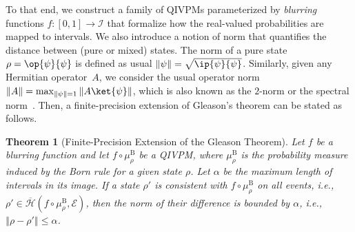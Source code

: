 \documentclass[english,reprint, aps, prl,superscriptaddress, showpacs,
showkeys, longbibliography, amsmath, amssymb, floatfix]{revtex4-1}
\theoremstyle{plain}
\newtheorem{thm}{Theorem}
\theoremstyle{definition}
\newcommand{\Hilb}{\mathcal{H}}
\newcommand{\events}{\ensuremath{\mathcal{E}}}
\newcommand{\proj}[1]{\op{#1}{#1}}
\newcommand{\coreBorn}{\ensuremath{\overline{\Hilb}}}
\newcommand{\ultramodular}{\mathcal{M}}
\begin{document}
To that end, we construct a family of QIVPMs parameterized by
\emph{blurring} functions $f:\left[0,1\right]\rightarrow\mathscr{I}$ that
formalize how the real-valued probabilities are mapped to
intervals. We also introduce a notion of norm that quantifies the
distance between (pure or mixed) states.  The norm of a pure
state $\rho=\proj{\psi}$ is defined as usual
$\left\Vert \psi\right\Vert =\sqrt{\ip{\psi}{\psi}}$.  Similarly,
given any Hermitian operator~$A$, we consider the usual operator norm
$\left\Vert A\right\Vert =\max_{\left\Vert \psi\right\Vert
  =1}\left\Vert A\ket{\psi}\right\Vert $, which is also known as the
$2$-norm or the spectral
norm~\citep{RobertsVarberg1973,peres1995quantum,GolubVanLoan1996,Foucart2012}.
Then, a finite-precision extension of Gleason's theorem can be stated as
follows.



\begin{thm}[Finite-Precision Extension of the Gleason
  Theorem]\label{thm:Finite-precision-Gleason}Let $f$ be a blurring
  function and let $f \circ \mu_{\rho}^{\mathrm{B}}$ be a QIVPM, where
  $\mu_{\rho}^{\mathrm{B}}$ is the probability measure induced by the
  Born rule for a given state $\rho$. Let $\alpha$ be the maximum
  length of intervals in its image. If a state $\rho'$ is consistent
  with $f\circ\mu_{\rho}^{\mathrm{B}}$ on all events, i.e.,
  $\rho'\in\coreBorn\left(f\circ\mu_{\rho}^{\mathrm{B}},\events\right)$,
  then the norm of their difference is bounded by $\alpha$, i.e.,
  $\left\Vert \rho-\rho'\right\Vert \le \alpha$.\end{thm}
\end{document}
